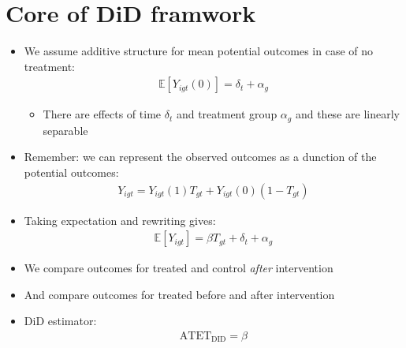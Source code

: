 \documentclass[10pt]{article}
\begin{document}
\section{Core of DiD framwork}
\begin{itemize}
    \item We assume additive structure for mean potential outcomes in case of no treatment: 
    \begin{gather*}
        \mathbb{E}[Y_{igt}(0)] = \delta_t + \alpha_g
    \end{gather*}
    \begin{itemize}
        \item There are effects of time $\delta_t $ and treatment group $\alpha_g $ and these are linearly separable 
    \end{itemize}
    \item Remember: we can represent the observed outcomes as a dunction of the potential outcomes: 
    \begin{gather*}
        Y_{igt} = Y_{igt}(1)T_{gt} + Y_{igt}(0) (1 - T_{gt})
    \end{gather*}
    \item Taking expectation and rewriting gives: 
    \begin{gather*}
        \mathbb{E}[Y_{igt}] = \beta T_{gt} + \delta_t + \alpha_g 
    \end{gather*}
    \item We compare outcomes for treated and control \textit{after} intervention 
    \item And compare outcomes for treated before and after intervention
    \item DiD estimator: 
    \begin{gather*}
        \text{ATET}_{\text{DID}} = \beta 
    \end{gather*}
\end{itemize}
\newpage 
\end{document}
